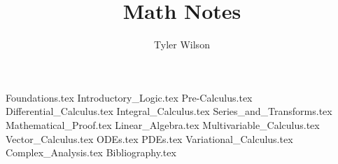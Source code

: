 \documentclass[11pt, fleqn]{article}
\title{Math Notes}
\author{Tyler Wilson}
\date{}
\begin{document}
\allowdisplaybreaks

\maketitle
\tableofcontents

{Foundations.tex}
{Introductory_Logic.tex}
{Pre-Calculus.tex}
{Differential_Calculus.tex}
{Integral_Calculus.tex}
{Series_and_Transforms.tex}
{Mathematical_Proof.tex}
{Linear_Algebra.tex}
{Multivariable_Calculus.tex}
{Vector_Calculus.tex}
{ODEs.tex}
{PDEs.tex}
{Variational_Calculus.tex}
{Complex_Analysis.tex}
{Bibliography.tex}
\end{document}
